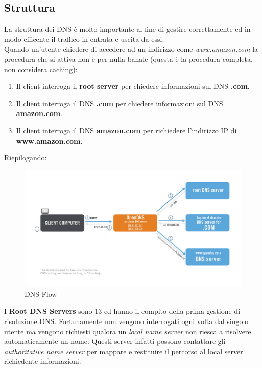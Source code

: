 \documentclass[12pt]{article}
\begin{document}
\subsection{Struttura} %
La struttura dei DNS è molto importante al fine di gestire correttamente ed in modo efficente il traffico in entrata e uscita da essi.\\
Quando un'utente chiedere di accedere ad un indirizzo come \textit{www.amazon.com} la procedura che si attiva non è per nulla banale (questa è la procedura completa, non considera caching):
\begin{enumerate}
  \item Il client interroga il \textbf{root server} per chiedere informazioni sul DNS \textbf{.com}.
  \item Il client interroga il DNS \textbf{.com} per chiedere informazioni sul DNS \textbf{amazon.com}.
  \item Il client interroga il DNS \textbf{amazon.com} per richiedere l'indirizzo IP di \textbf{www.amazon.com}.
\end{enumerate}
Riepilogando:

\begin{figure}[!hbpt]
  \includegraphics[width=\textwidth]{images/dnsflow.png}
  \caption{DNS Flow}
  \label{fig:dnsflow}
\end{figure}

I \textbf{Root DNS Servers} sono 13 ed hanno il compito della prima gestione di risoluzione DNS. Fortunamente non vengono interrogati ogni volta dal singolo utente ma vengono richiesti qualora un \textit{local name server} non riesca a risolvere automaticamente un nome. Questi server infatti possono contattare gli \textit{authoritative name server} per mappare e restituire il percorso al local server richiedente informazioni.
\end{document}
